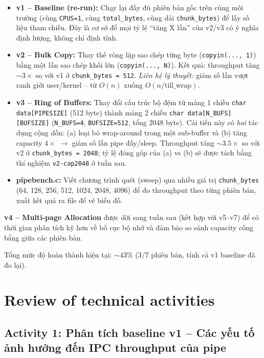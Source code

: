 \documentclass[11pt,a4paper]{article}
\begin{document}
\begin{itemize}
  \item \textbf{v1 -- Baseline (re-run):} Chạy lại đầy đủ phiên bản gốc trên cùng môi trường (cùng \texttt{CPUS=1}, cùng \texttt{total\_bytes}, cùng dải \texttt{chunk\_bytes}) để lấy số liệu tham chiếu. Đây là cơ sở để mọi tỷ lệ ``tăng X lần'' của v2/v3 có ý nghĩa định lượng, không chỉ định tính.
  \item \textbf{v2 -- Bulk Copy:} Thay thế vòng lặp sao chép từng byte (\texttt{copyin(..., 1)}) bằng một lần sao chép khối lớn (\texttt{copyin(..., N)}). Kết quả: throughput tăng $\sim 3\times$ so với v1 ở \texttt{chunk\_bytes = 512}. \emph{Liên hệ lý thuyết:} giảm số lần vượt ranh giới user/kernel -- từ $O(n)$ xuống $O(n / \text{till\_wrap})$.
  \item \textbf{v3 -- Ring of Buffers:} Thay đổi cấu trúc bộ đệm từ mảng 1 chiều \texttt{char data[PIPESIZE]} (512 byte) thành mảng 2 chiều \texttt{char data[N\_BUFS][BUFSIZE]} (\texttt{N\_BUFS=4}, \texttt{BUFSIZE=512}, tổng 2048 byte). Cải tiến này có \emph{hai} tác dụng cộng dồn: (a) loại bỏ wrap-around trong một sub-buffer và (b) tăng capacity $4\times$ $\rightarrow$ giảm số lần pipe đầy/sleep. Throughput tăng $\sim 3.5\times$ so với v2 ở \texttt{chunk\_bytes = 2048}; tỷ lệ đóng góp của (a) vs (b) sẽ được tách bằng thí nghiệm \texttt{v2-cap2048} ở tuần sau.
  \item \textbf{pipebench.c:} Viết chương trình quét (sweep) qua nhiều giá trị \texttt{chunk\_bytes} (64, 128, 256, 512, 1024, 2048, 4096) để đo throughput theo từng phiên bản, xuất kết quả ra file để vẽ biểu đồ.
\end{itemize}

\textbf{v4 -- Multi-page Allocation} được dời sang tuần sau (kết hợp với v5--v7) để có thời gian phân tích kỹ hơn về bố cục bộ nhớ và đảm bảo so sánh capacity công bằng giữa các phiên bản.

Tổng mức độ hoàn thành hiện tại: $\sim 43\%$ (3/7 phiên bản, tính cả v1 baseline đã đo lại).

\section{Review of technical activities}

\subsection{Activity 1: Phân tích baseline v1 -- Các yếu tố ảnh hưởng đến IPC throughput của pipe}
\end{document}

